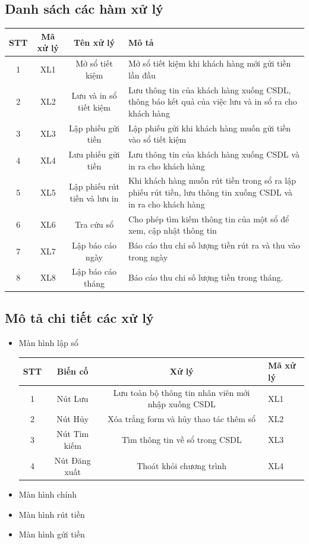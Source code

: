 \documentclass{article}
\begin{document}
		\subsection{Danh sách các hàm xử lý}
		
			\begin{tabular}{|c|c|c|p{4.5cm}|}
				\hline
				STT & Mã xử lý & Tên xử lý & Mô tả\\
				\hline
				1 & XL1 & Mở sổ tiết kiệm & Mở sổ tiết kiệm khi khách hàng mới gửi tiền lần đầu\\
				\hline
				2 & XL2 & Lưu và in sổ tiết kiệm & Lưu thông tin của khách hàng xuống CSDL, thông báo kết quả của việc lưu và in sổ ra cho khách hàng\\
				\hline
				3 & XL3 & Lập phiếu gửi tiền & Lập phiếu gửi khi khách hàng muốn gửi tiền vào sổ tiết kiệm\\
				\hline
				4 & XL4 & Lưu phiếu gửi tiền & Lưu thông tin của khách hàng xuống CSDL và in ra cho khách hàng\\
				\hline
				5 & XL5 & Lập phiếu rút tiền và lưu in & Khi khách hàng muốn rút tiền trong sổ ra lập phiếu rút tiền, lưu thông tin xuống CSDL và in ra cho khách hàng\\
				\hline
				6 & XL6 & Tra cứu sổ & Cho phép tìm kiếm thông tin của một sổ để xem, cập nhật thông tin\\
				\hline
				7 & XL7 & Lập báo cáo ngày & Báo cáo thu chi số lượng tiền rút ra và thu vào trong ngày\\
				\hline
				8 & XL8 & Lập báo cáo tháng & Báo cáo thu chi số lượng tiền trong tháng.\\
				\hline
			\end{tabular}
		
		\subsection{Mô tả chi tiết các xử lý}
		
			\begin{itemize}
				\item Màn hình lập sổ
				
					\begin{tabular}{|c|c|c|p{1.5cm}|}
						\hline
						STT & Biến cố & Xử lý & Mã xử lý\\
						\hline
						1 & Nút Lưu & Lưu toàn bộ thông tin nhân viên mới nhập xuống CSDL & XL1\\
						\hline
						2 & Nút Hủy & Xóa trắng form và hủy thao tác thêm sổ & XL2\\
						\hline
						3 & Nút Tìm kiếm & Tìm thông tin về sổ trong CSDL & XL3\\
						\hline
						4 & Nút Đăng xuất & Thoát khỏi chương trình & XL4\\
						\hline
					\end{tabular}
				
				\item Màn hình chính
				\item Màn hình rút tiền
				\item Màn hình gửi tiền
				
			\end{itemize}
	
\end{document}
